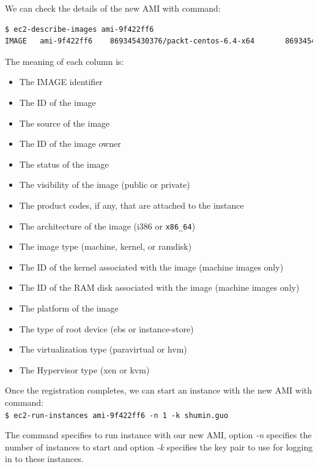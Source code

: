 We can check the details of the new AMI with command:
\lstset{style=bashstyle}
\begin{lstlisting}[language=bash]
$ ec2-describe-images ami-9f422ff6
IMAGE   ami-9f422ff6    869345430376/packt-centos-6.4-x64       869345430376    available       private             x86_64  machine                         instance-store  paravirtual     xen
\end{lstlisting}

The meaning of each column is:
\begin{itemize}
  \item The IMAGE identifier
  \item The ID of the image
  \item The source of the image
  \item The ID of the image owner
  \item The status of the image
  \item The visibility of the image (public or private)
  \item The product codes, if any, that are attached to the instance
  \item The architecture of the image (i386 or \verb|x86_64|)
  \item The image type (machine, kernel, or ramdisk)
  \item The ID of the kernel associated with the image (machine images only)
  \item The ID of the RAM disk associated with the image (machine images only)
  \item The platform of the image
  \item The type of root device (ebs or instance-store)
  \item The virtualization type (paravirtual or hvm)
  \item The Hypervisor type (xen or kvm)
\end{itemize}

Once the registration completes, we can start an instance with the new AMI with command: \\
\verb|$ ec2-run-instances ami-9f422ff6 -n 1 -k shumin.guo|

The command specifies to run instance with our new AMI, option \emph{-n} specifies the number of instances to start and option \emph{-k} specifies the key pair to use for logging in to these instances.

